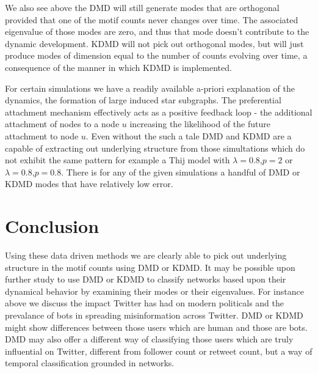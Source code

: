 We also see above the DMD will still generate modes that are orthogonal provided that
one of the motif counts never changes over time. The associated eigenvalue of those modes are zero,
and thus that mode doesn't contribute to the dynamic development. KDMD will not 
pick out orthogonal modes, but will just produce modes of dimension equal to the number of counts evolving
over time, a consequence of the manner in which KDMD is implemented.


For certain simulations we have a readily available a-priori explanation
of the dynamics, the formation of large induced star subgraphs. The preferential
attachment mechanism effectively acts as a positive feedback loop - the
additional attachment of nodes to a node $u$ increasing
the likelihood of the future attachment to node $u$. Even without 
the such a tale DMD and KDMD are a capable of extracting out underlying 
structure from those simultations which do not exhibit the same pattern
for example a Thij model with $\lambda=0.8$,$p=2$ or $\lambda=0.8$,$p=0.8$.
There is for any of the given simulations a handful of DMD or KDMD modes that 
have relatively low error. 



\chapter{Conclusion}

Using these data driven methods we are clearly able to pick out underlying structure in the motif
counts using DMD or KDMD. It may be possible upon further study to use
DMD or KDMD to classify networks based upon their dynamical behavior
by examining their modes or their eigenvalues. For instance above
we discuss the impact Twitter has had on modern politicals and the 
prevalance of bots in spreading misinformation across Twitter. DMD or KDMD
might show differences between those users which are human and those are 
bots. DMD may also offer a different way of classifying those users 
which are truly influential on Twitter, different from follower count or
retweet count, but a way of temporal classification grounded in networks.


